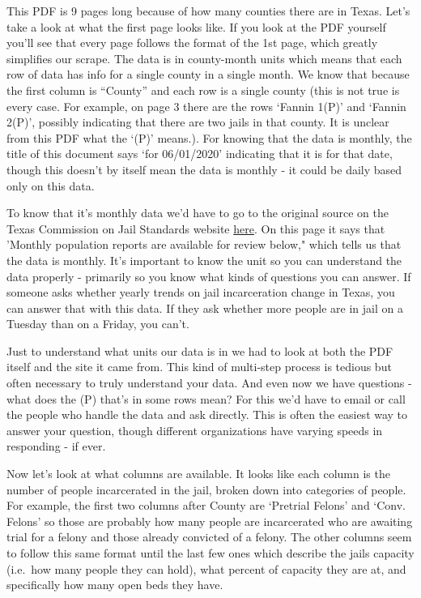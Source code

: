 \documentclass[
  12pt,
  openany]{book}
\begin{document}
This PDF is 9 pages long because of how many counties there are in Texas. Let's take a look at what the first page looks like. If you look at the PDF yourself you'll see that every page follows the format of the 1st page, which greatly simplifies our scrape. The data is in county-month units which means that each row of data has info for a single county in a single month. We know that because the first column is ``County'' and each row is a single county (this is not true is every case. For example, on page 3 there are the rows `Fannin 1(P)' and `Fannin 2(P)', possibly indicating that there are two jails in that county. It is unclear from this PDF what the `(P)' means.). For knowing that the data is monthly, the title of this document says `for 06/01/2020' indicating that it is for that date, though this doesn't by itself mean the data is monthly - it could be daily based only on this data.

To know that it's monthly data we'd have to go to the original source on the Texas Commission on Jail Standards website \href{https://www.tcjs.state.tx.us/historical-population-reports/\#1580454195676-420daca6-0a306}{here}. On this page it says that 'Monthly population reports are available for review below," which tells us that the data is monthly. It's important to know the unit so you can understand the data properly - primarily so you know what kinds of questions you can answer. If someone asks whether yearly trends on jail incarceration change in Texas, you can answer that with this data. If they ask whether more people are in jail on a Tuesday than on a Friday, you can't.

Just to understand what units our data is in we had to look at both the PDF itself and the site it came from. This kind of multi-step process is tedious but often necessary to truly understand your data. And even now we have questions - what does the (P) that's in some rows mean? For this we'd have to email or call the people who handle the data and ask directly. This is often the easiest way to answer your question, though different organizations have varying speeds in responding - if ever.

Now let's look at what columns are available. It looks like each column is the number of people incarcerated in the jail, broken down into categories of people. For example, the first two columns after County are `Pretrial Felons' and `Conv. Felons' so those are probably how many people are incarcerated who are awaiting trial for a felony and those already convicted of a felony. The other columns seem to follow this same format until the last few ones which describe the jails capacity (i.e.~how many people they can hold), what percent of capacity they are at, and specifically how many open beds they have.
\end{document}
